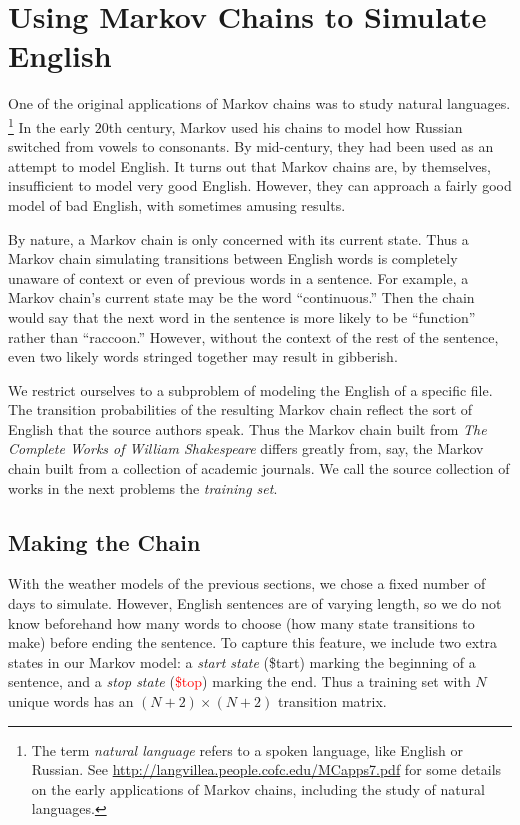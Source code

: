 \section*{Using Markov Chains to Simulate English} %
One of the original applications of Markov chains was to study natural languages.%
\footnote{The term \emph{natural language} refers to a spoken language, like English or Russian. See \url{http://langvillea.people.cofc.edu/MCapps7.pdf} for some details on the early applications of Markov chains, including the study of natural languages.}
In the early $20$th century, Markov used his chains to model how Russian switched from vowels to consonants.
By mid-century, they had been used as an attempt to model English.
It turns out that Markov chains are, by themselves, insufficient to model very good English.
However, they can approach a fairly good model of bad English, with sometimes amusing results.

By nature, a Markov chain is only concerned with its current state.
Thus a Markov chain simulating transitions between English words is completely unaware of context or even of previous words in a sentence.
For example, a Markov chain's current state may be the word ``continuous.''
Then the chain would say that the next word in the sentence is more likely to be ``function'' rather than ``raccoon.''
However, without the context of the rest of the sentence, even two likely words stringed together may result in gibberish.

We restrict ourselves to a subproblem of modeling the English of a specific file.
The transition probabilities of the resulting Markov chain reflect the sort of English that the source authors speak.
Thus the Markov chain built from \emph{The Complete Works of William Shakespeare} differs greatly from, say, the Markov chain built from a collection of academic journals.
We call the source collection of works in the next problems the \emph{training set}.

\subsection*{Making the Chain} %

With the weather models of the previous sections, we chose a fixed number of days to simulate.
However, English sentences are of varying length, so we do not know beforehand how many words to choose (how many state transitions to make) before ending the sentence.
To capture this feature, we include two extra states in our Markov model: a \emph{start state} (\textcolor[rgb]{0,.6,0}{\$tart}) marking the beginning of a sentence, and a \emph{stop state} (\textcolor{red}{\$top}) marking the end.
Thus a training set with $N$ unique words has an $(N+2)\times (N+2)$ transition matrix.

